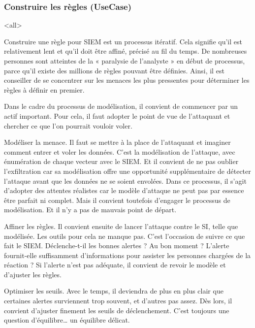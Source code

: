 \subsubsection{Construire les règles (UseCase)}




\mode<all>{}


Construire une règle pour SIEM est un processus itératif. Cela signifie qu’il est relativement lent et qu’il doit être affiné, précisé au fil du temps. De nombreuses personnes sont atteintes de la « paralysie de l’analyste » en début de processus, parce qu’il existe des millions de règles pouvant être définies. Ainsi, il est  conseiller de se concentrer sur les menaces les plus pressentes pour déterminer les règles à définir en premier.

Dans le cadre du processus de modélisation, il convient de commencer par un actif important. Pour cela, il faut adopter le point de vue de l’attaquant et chercher ce que l’on pourrait vouloir voler.

Modéliser la menace. Il faut se mettre à la place de l’attaquant et imaginer comment entrer et voler les données. C’est la modélisation de l’attaque, avec énumération de chaque vecteur avec le SIEM. Et il convient de ne pas oublier l’exfiltration car sa modélisation offre une opportunité supplémentaire de détecter l’attaque avant que les données ne se soient envolées. Dans ce processus, il s’agit d’adopter des attentes réalistes car le modèle d’attaque ne peut pas par essence être parfait ni complet. Mais il convient toutefois d’engager le processus de modélisation. Et il n’y a pas de mauvais point de départ.

Affiner les règles. Il convient ensuite de lancer l’attaque contre le SI, telle que modélisée. Les outils pour cela ne manque pas. C’est l’occasion de suivre ce que fait le SIEM. Déclenche-t-il les bonnes alertes ? Au bon moment ? L’alerte fournit-elle suffisamment d’informations pour assister les personnes chargées de la réaction ? Si l’alerte n’est pas adéquate, il convient de revoir le modèle et d’ajuster les règles.

Optimiser les seuils. Avec le temps, il deviendra de plus en plus clair que certaines alertes surviennent trop souvent, et d’autres pas assez. Dès lors, il convient d’ajuster finement les seuils de déclenchement. C’est toujours une question d’équilibre… un équilibre délicat.

